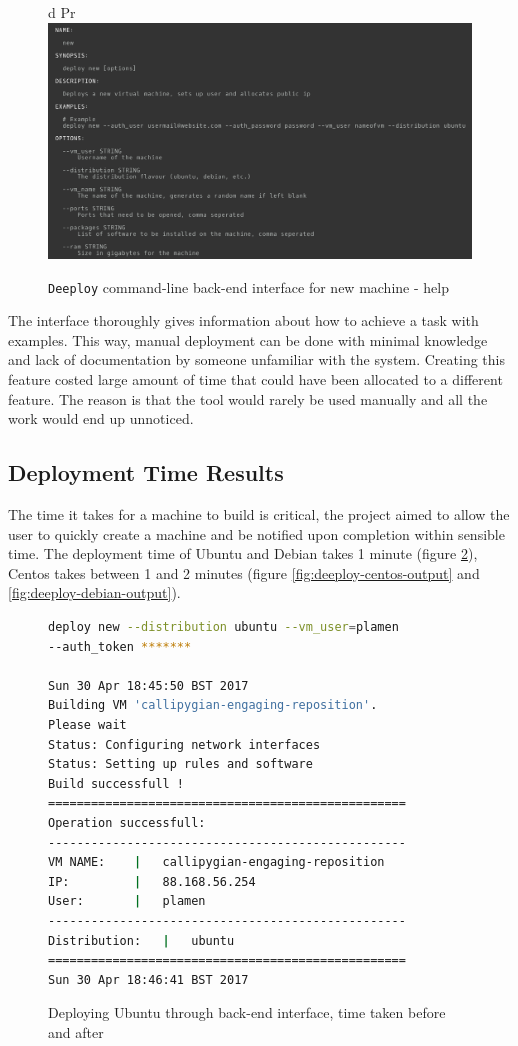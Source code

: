 \documentclass{article}
\begin{document}
\begin{figure}[h!]
d Pr\vspace{0.5cm}
\includegraphics[width=12cm]{deeploy_new_help_cli.png}
\vspace{0.5cm}
\caption{\texttt{Deeploy} command-line back-end interface for new machine - help}
\label{fig:deeploy-new-help}
\end{figure}

The interface thoroughly gives information about how to achieve a task with examples. This way, manual deployment can be done with minimal knowledge and lack of documentation by someone unfamiliar with the system. Creating this feature costed large amount of time that could have been allocated to a different feature. The reason is that the tool would rarely be used manually and all the work would end up unnoticed.

\subsection{Deployment Time Results}
The time it takes for a machine to build is critical, the project aimed to allow the user to quickly create a machine and be notified upon completion within sensible time. The deployment time of Ubuntu and Debian takes 1 minute (figure \ref{fig:deeploy-ubuntu-output}), Centos takes between 1 and 2 minutes (figure \ref{fig:deeploy-centos-output} and  \ref{fig:deeploy-debian-output}).

\begin{figure}[H]
\begin{lstlisting}[frame=single, language=Bash]
deploy new --distribution ubuntu --vm_user=plamen
--auth_token *******

Sun 30 Apr 18:45:50 BST 2017
Building VM 'callipygian-engaging-reposition'.
Please wait
Status: Configuring network interfaces
Status: Setting up rules and software
Build successfull !
==================================================
Operation successfull:
--------------------------------------------------
VM NAME:	|	callipygian-engaging-reposition
IP:			|	88.168.56.254
User:		|	plamen
--------------------------------------------------
Distribution:	|	ubuntu
==================================================
Sun 30 Apr 18:46:41 BST 2017
\end{lstlisting}
\caption{Deploying Ubuntu through back-end interface, time taken before and after}
\label{fig:deeploy-ubuntu-output}
\end{figure}
\end{document}
